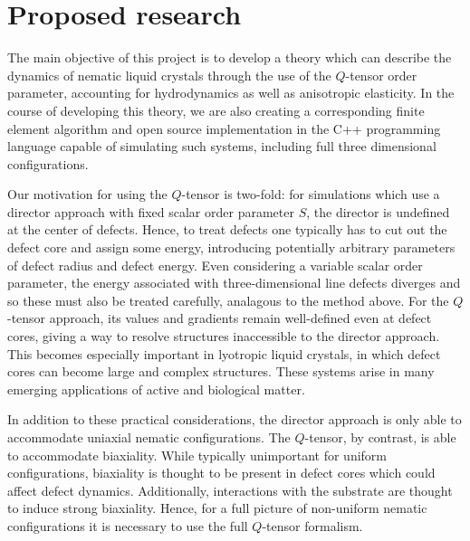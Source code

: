\documentclass[reqno]{article}
\begin{document}
  \section{Proposed research}
  The main objective of this project is to develop a theory which can describe
  the dynamics of nematic liquid crystals through the use of the $Q$-tensor
  order parameter, accounting for hydrodynamics as well as anisotropic
  elasticity.
  In the course of developing this theory, we are also creating a corresponding
  finite element algorithm and open source implementation in the C++ programming
  language capable of simulating such systems, including full three dimensional
  configurations.
  
  Our motivation for using the $Q$-tensor is two-fold: for simulations which use
  a director approach with fixed scalar order parameter $S$, the director is
  undefined at the center of defects.
  Hence, to treat defects one typically has to cut out the defect core and
  assign some energy, introducing potentially arbitrary parameters of defect
  radius and defect energy.
  Even considering a variable scalar order parameter, the energy associated with
  three-dimensional line defects diverges and so these must also be treated
  carefully, analagous to the method above.
  For the $Q$-tensor approach, its values and gradients remain well-defined even
  at defect cores, giving a way to resolve structures inaccessible to the
  director approach.
  This becomes especially important in lyotropic liquid crystals, in which
  defect cores can become large and complex structures.
  These systems arise in many emerging applications of active and biological
  matter.
  
  In addition to these practical considerations, the director approach is
  only able to accommodate uniaxial nematic configurations.
  The $Q$-tensor, by contrast, is able to accommodate biaxiality.
  While typically unimportant for uniform configurations, biaxiality is thought
  to be present in defect cores which could affect defect dynamics.
  Additionally, interactions with the substrate are thought to induce strong
  biaxiality.
  Hence, for a full picture of non-uniform nematic configurations it is
  necessary to use the full $Q$-tensor formalism.
\end{document}

